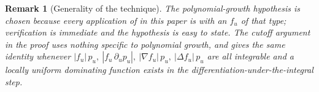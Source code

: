 \documentclass[11pt]{article}
\newtheorem{remark}{Remark}
\begin{document}
\begin{remark}[Generality of the technique]
\label{rem:heat_lemma_generality}
The polynomial-growth hypothesis is chosen because every application of  in this paper is with an \(f_u\) of that type; verification is immediate and the hypothesis is easy to state. The cutoff argument in the proof uses nothing specific to polynomial growth, and gives the same identity whenever \(|f_u|\,p_u,\ |f_u\,\partial_u p_u|,\ |\nabla f_u|\,p_u,\ |\Delta f_u|\,p_u\) are all integrable and a locally uniform dominating function exists in the differentiation-under-the-integral step.
\end{remark}
\end{document}
